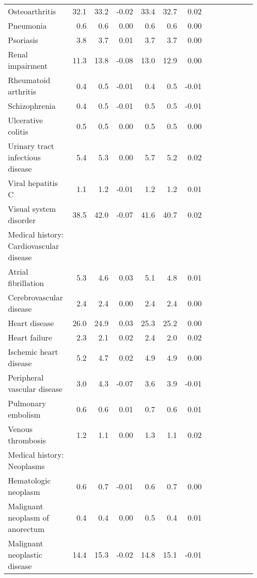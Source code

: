\documentclass[11pt,]{article}
\begin{document}
\begin{longtable}{lrrrrrrrrrrrr}
      Osteoarthritis & 32.1 & 33.2 & -0.02 & 33.4 & 32.7 &  0.02 \\ 
      Pneumonia &  0.6 &  0.6 &  0.00 &  0.6 &  0.6 &  0.00 \\ 
      Psoriasis &  3.8 &  3.7 &  0.01 &  3.7 &  3.7 &  0.00 \\ 
      Renal impairment & 11.3 & 13.8 & -0.08 & 13.0 & 12.9 &  0.00 \\ 
      Rheumatoid arthritis &  0.4 &  0.5 & -0.01 &  0.4 &  0.5 & -0.01 \\ 
      Schizophrenia &  0.4 &  0.5 & -0.01 &  0.5 &  0.5 & -0.01 \\ 
      Ulcerative colitis &  0.5 &  0.5 &  0.00 &  0.5 &  0.5 &  0.00 \\ 
      Urinary tract infectious disease &  5.4 &  5.3 &  0.00 &  5.7 &  5.2 &  0.02 \\ 
      Viral hepatitis C &  1.1 &  1.2 & -0.01 &  1.2 &  1.2 &  0.01 \\ 
      Visual system disorder & 38.5 & 42.0 & -0.07 & 41.6 & 40.7 &  0.02 \\ 
  Medical history: Cardiovascular disease &    &    &     &    &    &     \\ 
      Atrial fibrillation &  5.3 &  4.6 &  0.03 &  5.1 &  4.8 &  0.01 \\ 
      Cerebrovascular disease &  2.4 &  2.4 &  0.00 &  2.4 &  2.4 &  0.00 \\ 
      Heart disease & 26.0 & 24.9 &  0.03 & 25.3 & 25.2 &  0.00 \\ 
      Heart failure &  2.3 &  2.1 &  0.02 &  2.4 &  2.0 &  0.02 \\ 
      Ischemic heart disease &  5.2 &  4.7 &  0.02 &  4.9 &  4.9 &  0.00 \\ 
      Peripheral vascular disease &  3.0 &  4.3 & -0.07 &  3.6 &  3.9 & -0.01 \\ 
      Pulmonary embolism &  0.6 &  0.6 &  0.01 &  0.7 &  0.6 &  0.01 \\ 
      Venous thrombosis &  1.2 &  1.1 &  0.00 &  1.3 &  1.1 &  0.02 \\ 
  Medical history: Neoplasms &    &    &     &    &    &     \\ 
      Hematologic neoplasm &  0.6 &  0.7 & -0.01 &  0.6 &  0.7 &  0.00 \\ 
      Malignant neoplasm of anorectum &  0.4 &  0.4 &  0.00 &  0.5 &  0.4 &  0.01 \\ 
      Malignant neoplastic disease & 14.4 & 15.3 & -0.02 & 14.8 & 15.1 & -0.01 \\ 

\end{longtable}
\end{document}
